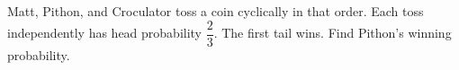 Matt, Pithon, and Croculator toss a coin cyclically in that order. Each toss independently has head probability $\dfrac{2}{3}$. The first tail wins. Find Pithon's winning probability.
